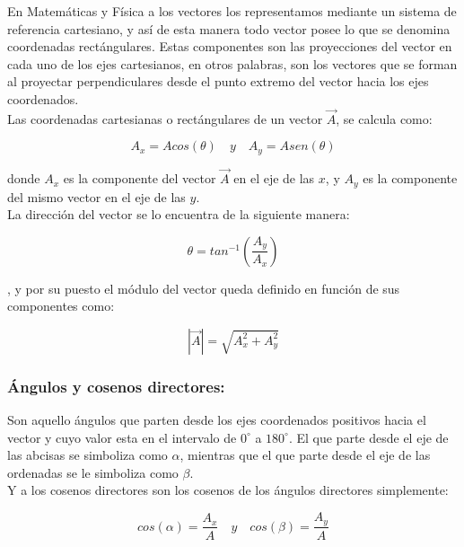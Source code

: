 En Matemáticas y Física a los vectores los representamos mediante un sistema de referencia cartesiano, y así de esta 
manera todo vector posee lo que se denomina coordenadas rectángulares. Estas componentes son las proyecciones del 
vector en cada uno de los ejes cartesianos, en otros palabras, son los vectores que se forman al proyectar 
perpendiculares desde el punto extremo del vector hacia los ejes coordenados.\\


Las coordenadas cartesianas o rectángulares de un vector $\vec{A}$, se calcula como:

\begin{equation}
A_x = Acos(\theta) \quad y \quad A_y = Asen(\theta) 
\end{equation}

donde $A_x$ es la componente del vector $\vec{A}$ en el eje de las $x$, y $A_y$ es la componente del mismo vector en el 
eje de las $y$.\\

La dirección del vector se lo encuentra de la siguiente manera:

\begin{equation}
 \theta = tan^{-1}(\frac{A_y}{A_x})
\end{equation}

, y por su puesto el módulo del vector queda definido en función de sus componentes como:

\begin{equation}
 |\vec{A}| = \sqrt{A_x^2 + A_y^2}
\end{equation}

\subsubsection{Ángulos y cosenos directores:}

Son aquello ángulos que parten desde los ejes coordenados positivos hacia el vector y cuyo valor esta en el intervalo 
de $0^\circ$ a $180^\circ$. El que parte desde el eje de las abcisas se simboliza como $\alpha$, mientras que el que 
parte desde el eje de las ordenadas se le simboliza como $\beta$.\\

Y a los cosenos directores son los cosenos de los ángulos directores simplemente:

\begin{equation}
 cos(\alpha) =\frac{A_x}{A}  \quad y \quad cos(\beta)=\frac{A_y}{A}
\end{equation}

